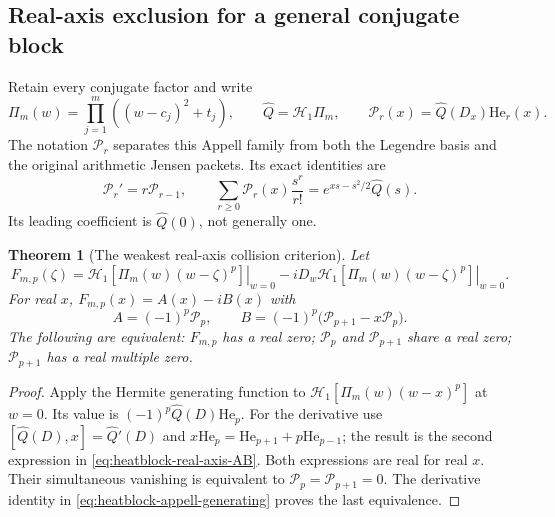 \documentclass[11pt]{article}
\newtheorem{theorem}{Theorem}[section]
\theoremstyle{definition}
\theoremstyle{remark}
\begin{document}
\subsection{Real-axis exclusion for a general conjugate block}
\label{subsec:heatblock-appell}

Retain every conjugate factor and write
\begin{equation}
 \Pi_m(w)=\prod_{j=1}^m((w-c_j)^2+t_j),\qquad
 \widehat Q=\mathcal H_1\Pi_m,\qquad
 \mathcal P_r(x)=\widehat Q(D_x)\mathrm{He}_r(x).
 \label{eq:heatblock-appell}
\end{equation}
The notation $\mathcal P_r$ separates this Appell family from both the
Legendre basis and the original arithmetic Jensen packets.  Its exact
identities are
\begin{equation}
 \mathcal P_r'=r\mathcal P_{r-1},\qquad
 \sum_{r\ge0}\mathcal P_r(x)\frac{s^r}{r!}
 =e^{xs-s^2/2}\widehat Q(s).
 \label{eq:heatblock-appell-generating}
\end{equation}
Its leading coefficient is $\widehat Q(0)$, not generally one.

\begin{theorem}[The weakest real-axis collision criterion]
\label{thm:heatblock-real-axis}
Let
\[
 F_{m,p}(\zeta)=
 \left.\mathcal H_1[\Pi_m(w)(w-\zeta)^p]\right|_{w=0}
 -i\left.D_w\mathcal H_1[\Pi_m(w)(w-\zeta)^p]\right|_{w=0}.
\]
For real $x$, $F_{m,p}(x)=A(x)-iB(x)$ with
\begin{equation}
 A=(-1)^p\mathcal P_p,
 \qquad
 B=(-1)^p\bigl(\mathcal P_{p+1}-x\mathcal P_p\bigr).
 \label{eq:heatblock-real-axis-AB}
\end{equation}
The following are equivalent: $F_{m,p}$ has a real zero;
$\mathcal P_p$ and $\mathcal P_{p+1}$ share a real zero;
$\mathcal P_{p+1}$ has a real multiple zero.
\end{theorem}

\begin{proof}
Apply the Hermite generating function to
$\mathcal H_1[\Pi_m(w)(w-x)^p]$ at $w=0$.
Its value is $(-1)^p\widehat Q(D)\mathrm{He}_p$.
For the derivative use
$[\widehat Q(D),x]=\widehat Q'(D)$ and
$x\mathrm{He}_p=\mathrm{He}_{p+1}+p\mathrm{He}_{p-1}$;
the result is the second expression in
\eqref{eq:heatblock-real-axis-AB}.
Both expressions are real for real $x$.  Their simultaneous vanishing
is equivalent to $\mathcal P_p=\mathcal P_{p+1}=0$.
The derivative identity in
\eqref{eq:heatblock-appell-generating} proves the last equivalence.
\end{proof}
\end{document}
